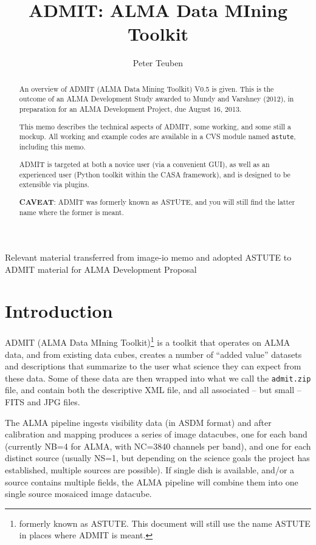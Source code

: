 \documentclass[preprint]{aastex} %
\begin{document}

\title{ADMIT: ALMA Data MIning Toolkit}

\author{Peter Teuben}

\begin{abstract}

An overview of ADMIT (ALMA Data Mining Toolkit) V0.5 is given. This is
the outcome of an ALMA Development Study awarded to Mundy and Varshney
(2012), in preparation for an ALMA Development Project, due August 16,
2013.

This memo describes the technical aspects of ADMIT, some working, and
some still a mockup. All working and example codes are available in a
CVS module named {\tt astute}, including this memo.

ADMIT is targeted at both a novice user (via a convenient GUI), as
well as an experienced user (Python toolkit within the CASA
framework), and is designed to be extensible via plugins.

{\bf CAVEAT}: ADMIT was formerly known as ASTUTE, and you will still
find the latter name where the former is meant.


\end{abstract}


\ChangeRecordBegin
{}
{Relevant material transferred from image-io memo and adopted ASTUTE to ADMIT}
{material for ALMA Development Proposal}
\ChangeRecordEnd


\section{Introduction}

ADMIT (ALMA Data MIning Toolkit)\footnote{formerly known as ASTUTE. 
This document will still use the name ASTUTE in places where ADMIT is meant.}
is a toolkit that operates on ALMA data, and from existing data cubes, 
creates a number of ``added value'' datasets and descriptions 
that summarize to the user
what science they can expect from these data. Some of these data
are then wrapped into what
we call the {\tt admit.zip} file, and contain both the descriptive XML
file, and all associated -- but small -- FITS and JPG files.

The ALMA pipeline ingests visibility data (in ASDM format) and after calibration
and mapping produces a series of image datacubes, one for each band (currently 
NB=4 for ALMA, with NC=3840 channels per band), and one for each distinct
source (usually NS=1, but depending on the science 
goals the project has established, multiple sources are possible). If
single dish is available, and/or a source contains multiple fields,
the ALMA pipeline will combine them into one single source 
mosaiced image datacube.
\end{document}
